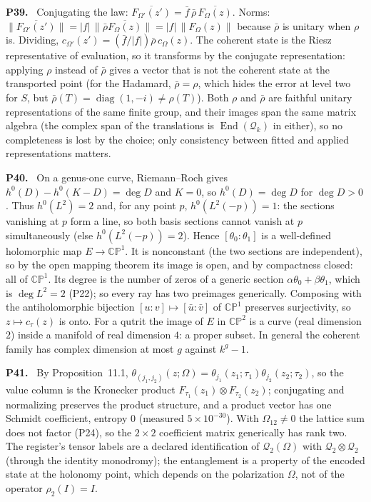 \documentclass[11pt]{article}
\newenvironment{solution}[1]{\medskip\noindent\textbf{P#1.}\ }{\par\medskip}
\begin{document}
\begin{solution}{39}
Conjugating the law: $\overline{F_{\Omega'}(z')} = \bar f\,\bar\rho\,\overline{F_\Omega(z)}$.
Norms: $\|\overline{F_{\Omega'}(z')}\| = |f|\,\|\bar\rho\overline{F_\Omega(z)}\| = |f|\,\|F_\Omega(z)\|$
because $\bar\rho$ is unitary when $\rho$ is. Dividing,
$c_{\Omega'}(z') = (\bar f/|f|)\bar\rho\,c_\Omega(z)$. The coherent state is the
Riesz representative of evaluation, so it transforms by the conjugate
representation: applying $\rho$ instead of $\bar\rho$ gives a vector that is
not the coherent state at the transported point (for the Hadamard, $\bar\rho = \rho$,
which hides the error at level two for $S$, but $\bar\rho(T) = \operatorname{diag}(1,-i)\ne\rho(T)$).
Both $\rho$ and $\bar\rho$ are faithful unitary representations of the same
finite group, and their images span the same matrix algebra (the complex span
of the translations is $\operatorname{End}(\mathcal Q_k)$ in either), so no
completeness is lost by the choice; only consistency between fitted and
applied representations matters.
\end{solution}

\begin{solution}{40}
On a genus-one curve, Riemann--Roch gives $h^0(D)-h^0(K-D) = \deg D$ and $K = 0$,
so $h^0(D) = \deg D$ for $\deg D>0$. Thus $h^0(L^2) = 2$ and, for any point $p$,
$h^0(L^2(-p)) = 1$: the sections vanishing at $p$ form a line, so both basis
sections cannot vanish at $p$ simultaneously (else $h^0(L^2(-p)) = 2$). Hence
$[\theta_0:\theta_1]$ is a well-defined holomorphic map $E\to\mathbb{CP}^1$.
It is nonconstant (the two sections are independent), so by the open mapping
theorem its image is open, and by compactness closed: all of $\mathbb{CP}^1$.
Its degree is the number of zeros of a generic section $\alpha\theta_0+\beta\theta_1$,
which is $\deg L^2 = 2$ (P22); so every ray has two preimages generically.
Composing with the antiholomorphic bijection $[u:v]\mapsto[\bar u:\bar v]$ of
$\mathbb{CP}^1$ preserves surjectivity, so $z\mapsto c_\tau(z)$ is onto. For
a qutrit the image of $E$ in $\mathbb{CP}^2$ is a curve (real dimension $2$)
inside a manifold of real dimension $4$: a proper subset. In general the
coherent family has complex dimension at most $g$ against $k^g-1$.
\end{solution}

\begin{solution}{41}
By Proposition~11.1, $\theta_{(j_1,j_2)}(z;\Omega) = \theta_{j_1}(z_1;\tau_1)\theta_{j_2}(z_2;\tau_2)$,
so the value column is the Kronecker product $F_{\tau_1}(z_1)\otimes F_{\tau_2}(z_2)$;
conjugating and normalizing preserves the product structure, and a product
vector has one Schmidt coefficient, entropy $0$ (measured $5\times10^{-30}$).
With $\Omega_{12}\ne0$ the lattice sum does not factor (P24), so the
$2\times2$ coefficient matrix generically has rank two. The register's tensor
labels are a declared identification of $\mathcal Q_2(\Omega)$ with
$\mathcal Q_2\otimes\mathcal Q_2$ (through the identity monodromy); the
entanglement is a property of the encoded state at the holonomy point, which
depends on the polarization $\Omega$, not of the operator $\rho_2(I) = I$.
\end{solution}
\end{document}
